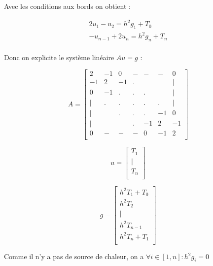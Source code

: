 \documentclass[11pt]{article}
\begin{document}
Avec les conditions aux bords on obtient :

\begin{equation*}
  \begin{array}{l}
    2 u_1 - u_2 = h^2 g_1 + T_0 \\
    - u_{n-1} + 2 u_n = h^2 g_n + T_n \\
  \end{array}
\end{equation*}

Donc on explicite le système linéaire $Au = g$ :

\begin{equation*}
  A = \left[
    \begin{array}{ccccccc}
      2 & -1 & 0 & - & - & - & 0 \\
      -1 & 2 & -1 & . &  &  & |  \\
      0 & -1 & . & . & . &  & |  \\
      | & . & . & . & . & . & |  \\
      | & & . & . & . & -1 & 0  \\
      | & & & . & -1 & 2 & -1  \\
      0 & - & - & - & 0 & -1 & 2 \\
    \end{array}
    \right]
\end{equation*}

\begin{equation*}
  u = \left[
    \begin{array}{c}
      T_1 \\
      | \\
      T_n \\
    \end{array}
    \right]
\end{equation*}

\begin{equation*}
  g = \left[
    \begin{array}{c}
      h^2 T_1 + T_0 \\
      h^2 T_2 \\
      | \\
      h^2 T_{n-1} \\
      h^2T_n + T_1\\
    \end{array}
    \right]
\end{equation*}

Comme il n'y a pas de source de chaleur, on a $\forall i \in [ 1, n
] : h^2 g_i = 0$
\end{document}
